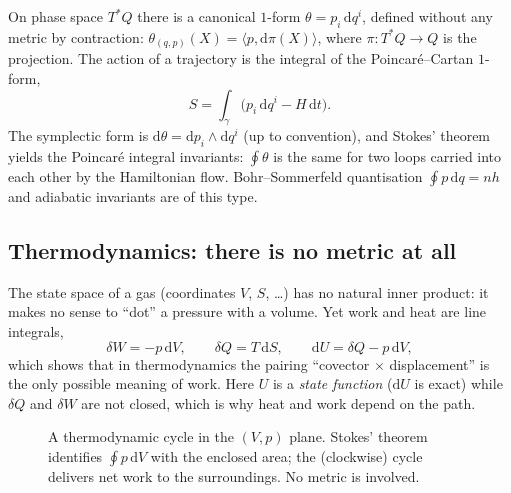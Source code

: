 \documentclass[11pt,a4paper]{article}
\numberwithin{equation}{section}
\theoremstyle{definition}
\theoremstyle{plain}
\newcommand{\dd}{\mathrm{d}}
\begin{document}
On phase space $T^*Q$ there is a canonical $1$-form $\theta=p_i\,\dd q^i$, defined without any metric by contraction: $\theta_{(q,p)}(X)=\langle p,\dd\pi(X)\rangle$, where $\pi:T^*Q\to Q$ is the projection. The action of a trajectory is the integral of the Poincar\'e--Cartan $1$-form,
\begin{equation}\label{eq:action}
S=\int_\gamma\bigl(p_i\,\dd q^i-H\,\dd t\bigr).
\end{equation}
The symplectic form is $\dd\theta=\dd p_i\wedge\dd q^i$ (up to convention), and Stokes' theorem yields the Poincar\'e integral invariants: $\oint\theta$ is the same for two loops carried into each other by the Hamiltonian flow. Bohr--Sommerfeld quantisation $\oint p\,\dd q=nh$ and adiabatic invariants are of this type.

\subsection{Thermodynamics: there is no metric at all}\label{sec:phys-thermo}

The state space of a gas (coordinates $V$, $S$, \dots) has no natural inner product: it makes no sense to ``dot'' a pressure with a volume. Yet work and heat are line integrals,
\begin{equation}\label{eq:thermo}
\delta W=-p\,\dd V,\qquad\delta Q=T\,\dd S,\qquad\dd U=\delta Q-p\,\dd V,
\end{equation}
which shows that in thermodynamics the pairing ``covector $\times$ displacement'' is the only possible meaning of work. Here $U$ is a \emph{state function} ($\dd U$ is exact) while $\delta Q$ and $\delta W$ are not closed, which is why heat and work depend on the path.

\begin{figure}[ht]
\centering
{}
\caption{A thermodynamic cycle in the $(V,p)$ plane. Stokes' theorem identifies $\oint p\,\dd V$ with the enclosed area; the (clockwise) cycle delivers net work to the surroundings. No metric is involved.}
\label{fig:cycle}
\end{figure}
\end{document}
